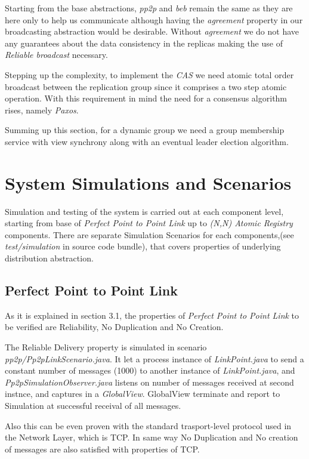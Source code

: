 \documentclass[a4paper, 11pt]{article}
\begin{document}
Starting from the base abstractions, \textit{pp2p} and \textit{beb} remain the same as they are here only to help us communicate although having the \textit{agreement} property in our broadcasting abstraction would be desirable. Without \textit{agreement} we do not have any guarantees about the data consistency in the replicas making the use of \textit{Reliable broadcast} necessary. \par 
Stepping up the complexity, to implement the \textit{CAS} we need atomic total order broadcast between the replication group since it comprises a two step atomic operation. With this requirement in mind the need for a consensus algorithm rises, namely \textit{Paxos}. \par
Summing up this section, for a dynamic group we need a group membership service with view synchrony along with an eventual leader election algorithm. \par

\section{System Simulations and Scenarios}
Simulation and testing of the system is carried out at each component level, starting from base of \textit{Perfect Point to Point Link} up to \textit{(N,N) Atomic Registry} components.
There are separate Simulation Scenarios for each components,(see \textit{test/simulation} in source code bundle), that covers properties of underlying distribution abstraction.

\subsection{Perfect Point to Point Link}

As it is explained in section 3.1, the properties of \textit{Perfect Point to Point Link} to be verified are Reliability, No Duplication and No Creation.

The Reliable Delivery property is simulated in scenario \textit{pp2p/Pp2pLinkScenario.java}. It let a process instance of \textit{LinkPoint.java} to send a constant number of messages (1000) to another instance of \textit{LinkPoint.java}, and \textit{Pp2pSimulationObserver.java} listens on number of messages received at second instnce, and captures in a 
\textit{GlobalView}. GlobalView terminate and report to Simulation at successful receival of all messages.

Also this can be even proven with the standard trasport-level protocol used in the Network Layer, which is TCP. In same way No Duplication and No creation of messages are also satisfied with properties of TCP.
\end{document}
